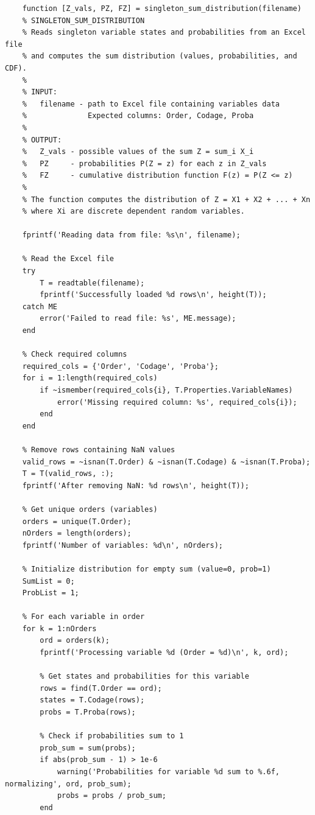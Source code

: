 \begin{matlab}
    \begin{lstlisting}
    function [Z_vals, PZ, FZ] = singleton_sum_distribution(filename)
    % SINGLETON_SUM_DISTRIBUTION
    % Reads singleton variable states and probabilities from an Excel file
    % and computes the sum distribution (values, probabilities, and CDF).
    %
    % INPUT:
    %   filename - path to Excel file containing variables data
    %              Expected columns: Order, Codage, Proba
    %
    % OUTPUT:
    %   Z_vals - possible values of the sum Z = sum_i X_i
    %   PZ     - probabilities P(Z = z) for each z in Z_vals  
    %   FZ     - cumulative distribution function F(z) = P(Z <= z)
    %
    % The function computes the distribution of Z = X1 + X2 + ... + Xn
    % where Xi are discrete dependent random variables.

    fprintf('Reading data from file: %s\n', filename);
    
    % Read the Excel file
    try
        T = readtable(filename);
        fprintf('Successfully loaded %d rows\n', height(T));
    catch ME
        error('Failed to read file: %s', ME.message);
    end

    % Check required columns
    required_cols = {'Order', 'Codage', 'Proba'};
    for i = 1:length(required_cols)
        if ~ismember(required_cols{i}, T.Properties.VariableNames)
            error('Missing required column: %s', required_cols{i});
        end
    end

    % Remove rows containing NaN values
    valid_rows = ~isnan(T.Order) & ~isnan(T.Codage) & ~isnan(T.Proba);
    T = T(valid_rows, :);
    fprintf('After removing NaN: %d rows\n', height(T));

    % Get unique orders (variables)
    orders = unique(T.Order);
    nOrders = length(orders);
    fprintf('Number of variables: %d\n', nOrders);

    % Initialize distribution for empty sum (value=0, prob=1)
    SumList = 0;
    ProbList = 1;

    % For each variable in order
    for k = 1:nOrders
        ord = orders(k);
        fprintf('Processing variable %d (Order = %d)\n', k, ord);
        
        % Get states and probabilities for this variable
        rows = find(T.Order == ord);
        states = T.Codage(rows);
        probs = T.Proba(rows);
        
        % Check if probabilities sum to 1
        prob_sum = sum(probs);
        if abs(prob_sum - 1) > 1e-6
            warning('Probabilities for variable %d sum to %.6f, normalizing', ord, prob_sum);
            probs = probs / prob_sum;
        end
        

\end{lstlisting}
\end{matlab}
